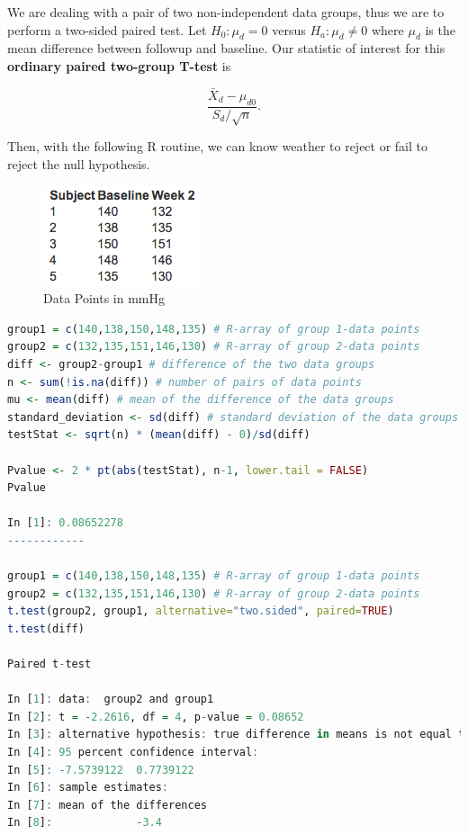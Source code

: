 \documentclass{homework}
\begin{document}
We are dealing with a pair of two non-independent data groups, thus we are to perform a two-sided paired test. Let $H_0: \mu_d = 0$ versus $H_a: \mu_d \neq 0$ where $\mu_d$ is the mean difference between followup and baseline. Our statistic of interest for this \textbf{ordinary paired two-group T-test} is 

$$
\frac{\bar{X}_d - \mu_{d0}}{S_d/\sqrt{n}}.
$$

Then, with the following R routine, we can know weather to reject or fail to reject the null hypothesis.

\begin{figure}
    \centering
    \includegraphics[scale=0.7]{figs/data points_week1.png}
    \caption{Data Points in mmHg}
    \label{fig:data}
\end{figure}

\begin{lstlisting}[language=R]
group1 = c(140,138,150,148,135) # R-array of group 1-data points
group2 = c(132,135,151,146,130) # R-array of group 2-data points
diff <- group2-group1 # difference of the two data groups
n <- sum(!is.na(diff)) # number of pairs of data points
mu <- mean(diff) # mean of the difference of the data groups
standard_deviation <- sd(diff) # standard deviation of the data groups 
testStat <- sqrt(n) * (mean(diff) - 0)/sd(diff) 

Pvalue <- 2 * pt(abs(testStat), n-1, lower.tail = FALSE) 
Pvalue

In [1]: 0.08652278
------------

group1 = c(140,138,150,148,135) # R-array of group 1-data points
group2 = c(132,135,151,146,130) # R-array of group 2-data points
t.test(group2, group1, alternative="two.sided", paired=TRUE)
t.test(diff)

Paired t-test

In [1]: data:  group2 and group1
In [2]: t = -2.2616, df = 4, p-value = 0.08652
In [3]: alternative hypothesis: true difference in means is not equal to 0
In [4]: 95 percent confidence interval:
In [5]: -7.5739122  0.7739122
In [6]: sample estimates:
In [7]: mean of the differences 
In [8]:             -3.4 
\end{lstlisting}
\end{document}
